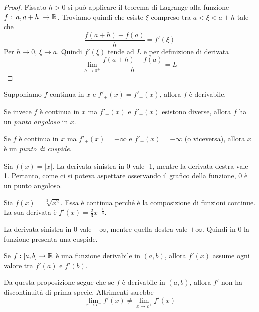 \begin{proof}
Fissato $h > 0$ si può applicare il teorema di Lagrange alla funzione $f: [a, a+h] \to \mathbb R$. Troviamo quindi che esiste $\xi$ compreso tra $a < \xi < a +h$ tale che
\begin{equation*}
\frac{f(a+h)-f(a)}{h} = f'(\xi)
\end{equation*}
Per $h \to 0$, $\xi \to a$. Quindi $f'(\xi)$ tende ad $L$ e per definizione di derivata
\begin{equation*}
\lim_{h \to 0^+} \frac{f(a+h)-f(a)}{h} = L
\end{equation*}
\end{proof}

Supponiamo $f$ continua in $x$ e $f'_+(x) = f'_-(x)$, allora $f$ è derivabile.

Se invece $f$ è continua in $x$ ma $f'_+(x)$ e $f'_-(x)$ esistono diverse, allora $f$ ha un \emph{punto angoloso} in $x$.

Se $f$ è continua in $x$ ma $f'_+(x) = +\infty$ e $f'_-(x) = -\infty$ (o viceversa), allora $x$ è un \emph{punto di cuspide}.

\begin{example}
Sia $f(x) = |x|$. La derivata sinistra in 0 vale -1, mentre la derivata destra vale 1. Pertanto, come ci si poteva aspettare osservando il grafico della funzione, 0 è un punto angoloso.
\end{example}

\begin{example}
Sia $f(x) = \sqrt[3]{x^2}$. Essa è continua perché è la composizione di funzioni continue. La sua derivata è $f'(x) = \frac{2}{3}x^{-\frac{1}{3}}$.

La derivata sinistra in 0 vale $-\infty$, mentre quella destra vale $+\infty$. Quindi in 0 la funzione presenta una cuspide.
	
\end{example}

\begin{proposition}
Se $f:[a,b] \to \mathbb R$ è una funzione derivabile in $(a,b)$, allora $f'(x)$ assume ogni valore tra $f'(a)$ e $f'(b)$.
\end{proposition}

Da questa proposizione segue che se $f$ è derivabile in $(a,b)$, allora $f'$ non ha discontinuità di prima specie. Altrimenti sarebbe
\begin{equation*}
\lim_{x \to c^-} f'(x) \neq \lim_{x \to c^+} f'(x)
\end{equation*}

